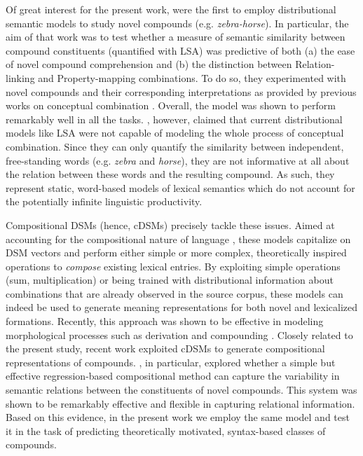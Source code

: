 \documentclass[output=paper]{langsci/langscibook}
\begin{document}
Of great interest for the present work, \cite{lynott2001} were the first to employ distributional semantic models to study novel compounds (e.g. \emph{zebra-horse}). In particular, the aim of that work was to test whether a measure of semantic similarity between compound constituents (quantified with LSA) was predictive of both (a) the ease of novel compound comprehension and (b) the distinction between Relation-linking and Property-mapping combinations. To do so, they experimented with novel compounds and their corresponding interpretations as provided by previous works on conceptual combination \citep{wisniewskilove,gagne2000}. Overall, the model was shown to perform remarkably well in all the tasks. \cite{lynott2001}, however, claimed that current distributional models like LSA were not capable of modeling the whole process of conceptual combination. Since they can only quantify the similarity between independent, free-standing words (e.g. \emph{zebra} and \emph{horse}), they are not informative at all about the relation between these words and the resulting compound. As such, they represent static, word-based models of lexical semantics which do not account for the potentially infinite linguistic productivity.


Compositional DSMs (hence, cDSMs) precisely tackle these issues. Aimed at accounting for the compositional nature of language \citep{baronifrege}, these models capitalize on DSM vectors and perform either simple \citep{mitchell2010} or more complex, theoretically inspired operations \citep{baroni2010,guevara2010,zanzotto2010} to \emph{compose} existing lexical entries. By exploiting simple operations (sum, multiplication) or being trained with distributional information about combinations that are already observed in the source corpus, these models can indeed be used to generate meaning representations for both novel and lexicalized formations. Recently, this approach was shown to be effective in modeling morphological processes such as derivation and compounding \citep{marelli2015,gunther2016,marelli2017}. Closely related to the present study, recent work \citep{gunther2016,marelli2017} exploited cDSMs to generate compositional representations of compounds. \cite{marelli2017}, in particular, explored whether a simple but effective regression-based compositional method \citep{guevara2010} can capture the variability in semantic relations between the constituents of novel compounds. This system was shown to be remarkably effective and flexible in capturing relational information. Based on this evidence, in the present work we employ the same model and test it in the task of predicting theoretically motivated, syntax-based classes of compounds.
\end{document}
